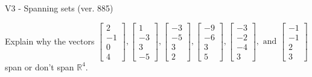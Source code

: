 \begin{exercise}
  \begin{exerciseTitle}V3 - Spanning sets (ver. 885)\end{exerciseTitle}
  \begin{exerciseStatement}
    Explain why the vectors \(\left[\begin{array}{r}
2 \\
-1 \\
0 \\
4
\end{array}\right] , \left[\begin{array}{r}
1 \\
-3 \\
3 \\
-5
\end{array}\right] , \left[\begin{array}{r}
-3 \\
-5 \\
3 \\
2
\end{array}\right] , \left[\begin{array}{r}
-9 \\
-6 \\
3 \\
5
\end{array}\right] , \left[\begin{array}{r}
-3 \\
-2 \\
-4 \\
3
\end{array}\right] , \text{ and } \left[\begin{array}{r}
-1 \\
-1 \\
2 \\
3
\end{array}\right]\) span or don't span \(\mathbb{R}^4\). 
	



\end{exerciseStatement}
\end{exercise}
